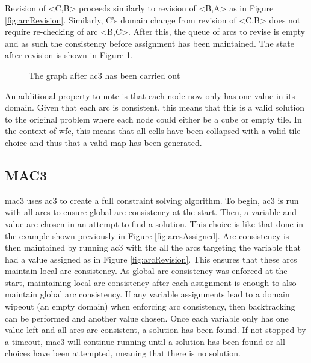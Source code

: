 Revision of <C,B> proceeds similarly to revision of <B,A> as in Figure \ref{fig:arcRevision}. Similarly, C's domain change from revision of <C,B> does not require re-checking of arc <B,C>. After this, the queue of arcs to revise is empty and as such the consistency before assignment has been maintained. The state after revision is shown in Figure \ref{fig:arcsRevised2}.

\begin{figure}[H]
    \centering

    \caption{The graph after \acrshort{ac3} has been carried out}
    \label{fig:arcsRevised2}
\end{figure}

An additional property to note is that each node now only has one value in its domain. Given that each arc is consistent, this means that this is a valid solution to the original problem where each node could either be a cube or empty tile. In the context of \acrshort{wfc}, this means that all cells have been collapsed with a valid tile choice and thus that a valid map has been generated.

\subsection{MAC3}
\acrfull{mac3} uses \acrfull{ac3} to create a full constraint solving algorithm. To begin, \acrshort{ac3} is run with all arcs to ensure global arc consistency at the start. Then, a variable and value are chosen in an attempt to find a solution. This choice is like that done in the example shown previously in Figure \ref{fig:arcsAssigned}. Arc consistency is then maintained by running \acrshort{ac3} with the all the arcs targeting the variable that had a value assigned as in Figure \ref{fig:arcRevision}. This ensures that these arcs maintain local arc consistency. As global arc consistency was enforced at the start, maintaining local arc consistency after each assignment is enough to also maintain global arc consistency. If any variable assignments lead to a domain wipeout (an empty domain) when enforcing arc consistency, then backtracking can be performed and another value chosen. Once each variable only has one value left and all arcs are consistent, a solution has been found. If not stopped by a timeout, \acrshort{mac3} will continue running until a solution has been found or all choices have been attempted, meaning that there is no solution.

